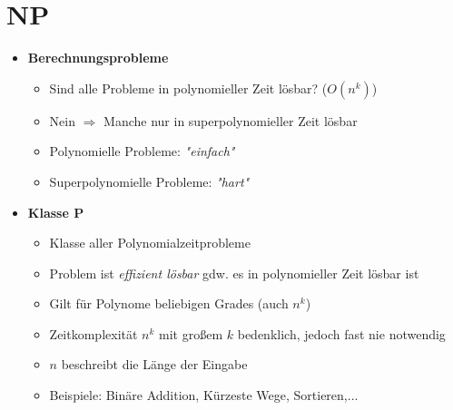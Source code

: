 \section{NP}
    \begin{itemize}
        \item \textbf{Berechnungsprobleme}
            \begin{itemize}
                \item Sind alle Probleme in polynomieller Zeit lösbar? ($O(n^k)$)
                \item Nein $\Rightarrow$ Manche nur in superpolynomieller Zeit lösbar
                \item Polynomielle Probleme: \textit{\string"einfach\string"}
                \item Superpolynomielle Probleme: \textit{\string"hart\string"}
            \end{itemize}
        
        \item \textbf{Klasse P}
            \begin{itemize}
                \item Klasse aller Polynomialzeitprobleme
                \item Problem ist \textit{effizient lösbar} gdw. es in polynomieller Zeit lösbar ist
                \item Gilt für Polynome beliebigen Grades (auch $n^k$)
                \item Zeitkomplexität $n^k$ mit gro\ss em $k$ bedenklich, jedoch fast nie notwendig
                \item $n$ beschreibt die Länge der Eingabe
                \item Beispiele: Binäre Addition, Kürzeste Wege, Sortieren,...
            \end{itemize}


\end{itemize}
